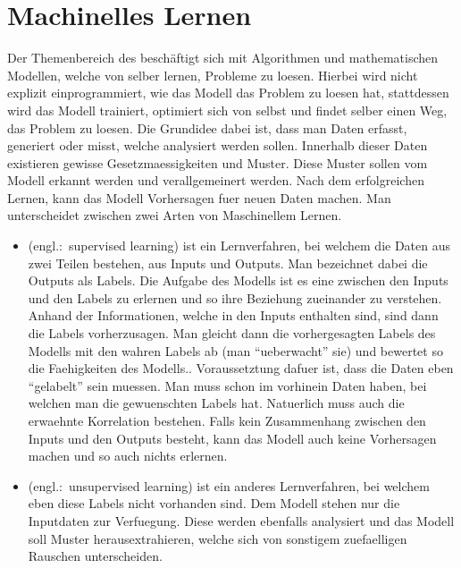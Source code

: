 \chapter{Machinelles Lernen}

Der Themenbereich des  beschäftigt sich mit Algorithmen und mathematischen Modellen, welche von selber lernen, Probleme zu loesen.
Hierbei wird nicht explizit einprogrammiert, wie das Modell das Problem zu loesen
hat, stattdessen wird das Modell trainiert, optimiert sich von selbst und findet selber
einen Weg, das Problem zu loesen.
Die Grundidee dabei ist, dass man Daten erfasst, generiert oder misst, welche
analysiert werden sollen. Innerhalb dieser Daten existieren gewisse
Gesetzmaessigkeiten und Muster. Diese Muster sollen vom Modell
erkannt werden und verallgemeinert werden. Nach dem erfolgreichen Lernen,
kann das Modell Vorhersagen fuer neuen Daten machen.
\para{}
Man unterscheidet zwischen zwei Arten von Maschinellem Lernen.
\begin{itemize}
\item{
     (engl.:\ supervised learning) ist ein
    Lernverfahren, bei welchem die Daten aus zwei Teilen bestehen, aus Inputs und
    Outputs. Man bezeichnet dabei die Outputs als Labels. Die Aufgabe des Modells
    ist es eine  zwischen den Inputs und den Labels zu
    erlernen und so ihre Beziehung zueinander zu verstehen.
    Anhand der Informationen, welche in den Inputs enthalten
    sind, sind dann die Labels vorherzusagen. Man gleicht dann die
    vorhergesagten Labels des Modells mit den wahren Labels ab (man
    ``ueberwacht'' sie) und bewertet so die Faehigkeiten des Modells..
    \para{}
    Voraussetztung dafuer ist, dass die Daten eben ``gelabelt'' sein muessen.
    Man muss schon im vorhinein Daten haben, bei welchen man die gewuenschten
    Labels hat. Natuerlich muss auch die erwaehnte Korrelation bestehen. Falls
    kein Zusammenhang zwischen den Inputs und den Outputs besteht, kann das
    Modell auch keine Vorhersagen machen und so auch nichts erlernen.
  }
\item{
     (engl.:\ unsupervised learning) ist ein anderes
    Lernverfahren, bei welchem eben diese Labels nicht vorhanden sind. Dem
    Modell stehen nur die Inputdaten zur Verfuegung. Diese werden ebenfalls analysiert
    und das Modell soll Muster herausextrahieren, welche sich von sonstigem
    zuefaelligen Rauschen unterscheiden.
  }
\end{itemize}

